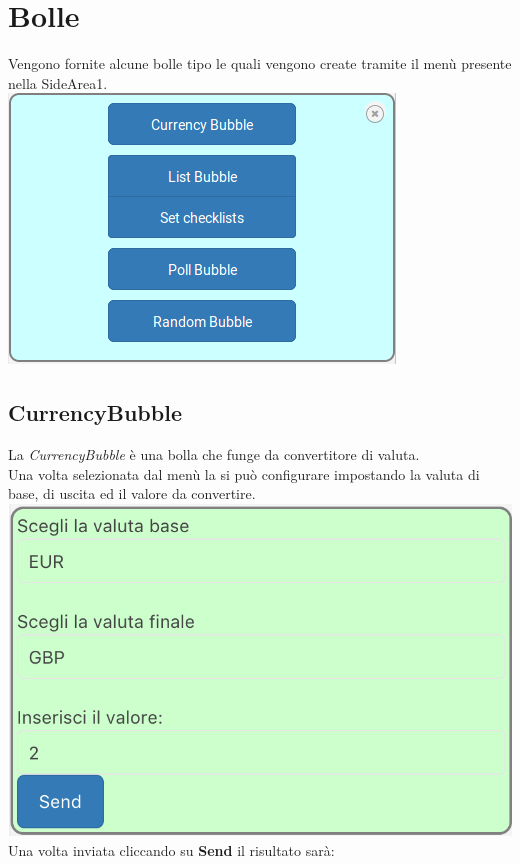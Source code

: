 \section{Bolle}
Vengono fornite alcune bolle tipo le quali vengono create tramite il menù presente nella SideArea1.\\

\includegraphics[scale=0.75]{img/menu.png}
\newpage
\subsection{CurrencyBubble}
La \textit{CurrencyBubble} è una bolla che funge da convertitore di valuta.
\\Una volta selezionata dal menù la si può configurare impostando la valuta di base, di uscita ed il valore da convertire.\\

\includegraphics[scale=0.75]{img/currConfig.png}
\\
Una volta inviata cliccando su \textbf{Send} il risultato sarà:\\

